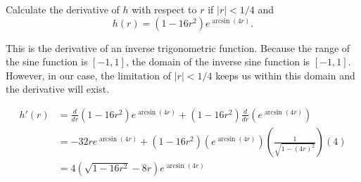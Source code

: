 \documentclass{ximera}
\author{Emma Smith Zbarsky}
\begin{document}
\begin{exercise}

Calculate the derivative of $h$ with respect to $r$ if $|r|<1/4$ and
\[h(r) = (1-16r^2)e^{\arcsin(4r)}.\]


\begin{hint}
This is the derivative of an inverse trigonometric function. Because the
range of the sine function is $[-1,1]$, the domain of the inverse sine
function is $[-1,1]$. However, in our case, the limitation of $|r|<1/4$
keeps us within this domain and the derivative will exist.
\end{hint}


\begin{hint}
\begin{align*}
h'(r) &= \frac{d}{dr}\left(1-16r^2\right)e^{\arcsin(4r)} + \left(1-16r^2\right)\frac{d}{dr}\left(e^{\arcsin(4r)}\right) \\
&= -32re^{\arcsin(4r)} + \left(1-16r^2\right)\left(e^{\arcsin(4r)}\right)\left(\frac{1}{\sqrt{1-(4r)^2}}\right)\left(4\right) \\
&= 4\left(\sqrt{1-16r^2}-8r\right)e^{\arcsin(4r)}
\end{align*}
\end{hint}


\begin{multipleChoice}
\end{multipleChoice}

\end{exercise}
\end{document}
